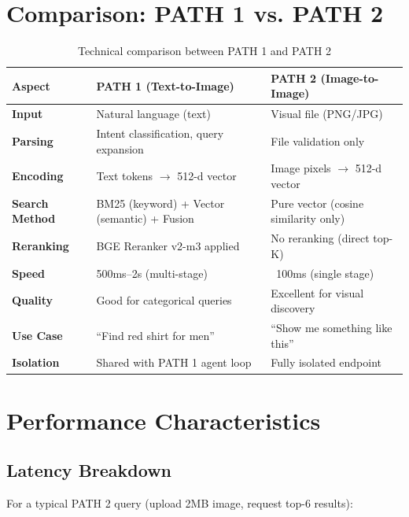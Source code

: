 \section{Comparison: PATH 1 vs. PATH 2}

\begin{table}[H]
\centering
\begin{tabular}{p{2cm}p{3.5cm}p{3.5cm}}
\toprule
\textbf{Aspect} & \textbf{PATH 1 (Text-to-Image)} & \textbf{PATH 2 (Image-to-Image)}\\
\midrule
\textbf{Input} & Natural language (text) & Visual file (PNG/JPG) \\
\textbf{Parsing} & Intent classification, query expansion & File validation only \\
\textbf{Encoding} & Text tokens $\rightarrow$ 512-d vector & Image pixels $\rightarrow$ 512-d vector \\
\textbf{Search Method} & BM25 (keyword) + Vector (semantic) + Fusion & Pure vector (cosine similarity only) \\
\textbf{Reranking} & BGE Reranker v2-m3 applied & No reranking (direct top-K) \\
\textbf{Speed} & 500ms--2s (multi-stage) & ~100ms (single stage) \\
\textbf{Quality} & Good for categorical queries & Excellent for visual discovery \\
\textbf{Use Case} & ``Find red shirt for men'' & ``Show me something like this'' \\
\textbf{Isolation} & Shared with PATH 1 agent loop & Fully isolated endpoint \\
\bottomrule
\end{tabular}
\caption{Technical comparison between PATH 1 and PATH 2}
\label{tab:path_comparison}
\end{table}

\section{Performance Characteristics}

\subsection{Latency Breakdown}

For a typical PATH 2 query (upload 2MB image, request top-6 results):

